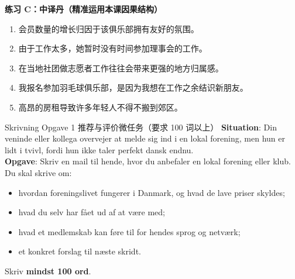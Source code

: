 \textbf{练习 C：中译丹（精准运用本课因果结构）}
\begin{enumerate}
  \item 会员数量的增长归因于该俱乐部拥有友好的氛围。
  \item 由于工作太多，她暂时没有时间参加理事会的工作。
  \item 在当地社团做志愿者工作往往会带来更强的地方归属感。
  \item 我报名参加羽毛球俱乐部，是因为我想在工作之余结识新朋友。
  \item 高昂的房租导致许多年轻人不得不搬到郊区。
\end{enumerate}


\begin{emailbox}{Skrivning Opgave 1 推荐与评价微任务（要求 100 词以上）}
\textbf{Situation}: Din veninde eller kollega overvejer at melde sig ind i en lokal forening, men hun er lidt i tvivl, fordi hun ikke taler perfekt dansk endnu.\\
\textbf{Opgave}: Skriv en mail til hende, hvor du anbefaler en lokal forening eller klub. Du skal skrive om:
\begin{itemize}
  \item hvordan foreningslivet fungerer i Danmark, og hvad de lave priser skyldes;
  \item hvad du selv har fået ud af at være med;
  \item hvad et medlemskab kan føre til for hendes sprog og netværk;
  \item et konkret forslag til næste skridt.
\end{itemize}
Skriv \textbf{mindst 100 ord}.
\end{emailbox}

